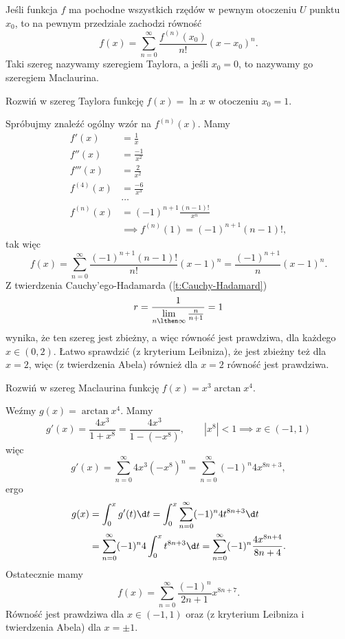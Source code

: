 \begin{theorem}
    Jeśli funkcja $f$ ma pochodne wszystkich rzędów w pewnym otoczeniu $U$ punktu $x_0$, to na pewnym przedziale zachodzi równość
    \[ f(x) = \sum_{n=0}^\infty \frac{f^{(n)}(x_0)}{n!}(x - x_0)^n. \]
    Taki szereg nazywamy szeregiem Taylora, a jeśli $x_0 = 0$, to nazywamy go szeregiem Maclaurina.
\end{theorem}

\begin{example}
    Rozwiń w szereg Taylora funkcję $f(x) = \ln{x}$ w otoczeniu $x_0 = 1$.
\end{example}
\begin{solution}
    Spróbujmy znaleźć ogólny wzór na $f^{(n)}(x)$. Mamy
    \begin{align*}
        f'(x) &= \frac{1}{x} \\
        f''(x) &= \frac{-1}{x^2} \\
        f'''(x) &= \frac{2}{x^2} \\
        f^{(4)}(x) &= \frac{-6}{x^3} \\
        &\ldots \\
        f^{(n)}(x) &= (-1)^{n+1}\frac{(n-1)!}{x^n} \\
        &\implies f^{(n)}(1) = (-1)^{n+1}(n-1)!,
    \end{align*}
    tak więc
    \[ f(x) = \sum_{n=0}^\infty \frac{(-1)^{n+1}(n-1)!}{n!}(x-1)^n = \frac{(-1)^{n+1}}{n}(x-1)^n. \]
    Z twierdzenia Cauchy'ego-Hadamarda (\ref{t:Cauchy-Hadamard})
    \[ r = \frac{1}{\lim\limits_{n\lthen\infty}\frac{n}{n+1}} = 1 \]
    wynika, że ten szereg jest zbieżny, a więc równość jest prawdziwa, dla każdego $x \in (0, 2)$. Łatwo sprawdzić (z kryterium Leibniza), że jest zbieżny też dla $x = 2$, więc (z twierdzenia Abela) również dla $x = 2$ równość jest prawdziwa.
\end{solution}

\begin{example}
    Rozwiń w szereg Maclaurina funkcję $f(x) = x^3\arctan{x^4}$.
\end{example}
\begin{solution}
    Weźmy $g(x) = \arctan{x^4}$. Mamy
    \[ g'(x) = \frac{4x^3}{1 + x^8} = \frac{4x^3}{1 - (-x^8)}, \hspace{2em} |x^8| < 1 \implies x \in (-1, 1) \]
    więc
    \[ g'(x) = \sum_{n=0}^\infty 4x^3 (-x^8)^n = \sum_{n=0}^\infty (-1)^n 4x^{8n+3}, \]
    ergo
    \begin{align*}
        g(x) &= \int_0^x g'(t) \d t = \int_0^x\sum_{n=0}^\infty (-1)^n 4t^{8n+3} \d t \\
        &= \sum_{n=0}^\infty (-1)^n 4 \int_0^x t^{8n+3} \d t = \sum_{n=0}^\infty (-1)^n \frac{4x^{8n+4}}{8n+4}.
    \end{align*}
    Ostatecznie mamy
    \[ f(x) = \sum_{n=0}^\infty \frac{(-1)^n}{2n+1}x^{8n+7}. \]
    Równość jest prawdziwa dla $x \in (-1, 1)$ oraz (z kryterium Leibniza i twierdzenia Abela) dla $x = \pm 1$.
\end{solution}